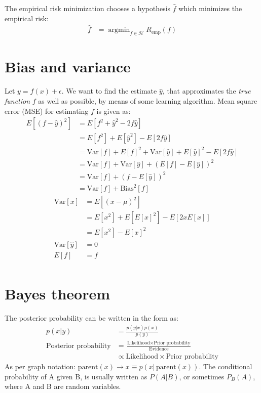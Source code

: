 \documentclass{book}
\DeclareMathOperator*{\argmin}{argmin}
\begin{document}
The empirical risk minimization chooses a hypothesis $\hat{f}$ which minimizes the empirical risk:
\begin{align*}
\hat{f} &=  \argmin_{f \in \mathcal{H}}{R_{\mbox{emp}}(f)}
\end{align*}

\section{Bias and variance}
Let $y = f(x) + \epsilon$. We want to find the estimate $\hat{y}$, that approximates the \emph{true function} $f$ as well as possible, by means of some learning algorithm. Mean square error (MSE) for estimating $f$ is given as:
\begin{align*}
E[(f-\hat{y})^2] &= E[f^2 + \hat{y}^2 - 2f\hat{y}]\\
			             &= E[f^2] + E[\hat{y}^2] - E[2f\hat{y}]\\
			             &= \mbox{Var}[f] + E[f]^2 + \mbox{Var}[\hat{y}] + E[\hat{y}]^2 - E[2f\hat{y}] \\
			             &= \mbox{Var}[f] +  \mbox{Var}[\hat{y}] + (E[f] - E[\hat{y}])^2 \\
			             &= \mbox{Var}[f] +  (f - E[\hat{y}])^2 \\
			             &= \mbox{Var}[f] + \mbox{Bias}^2[f]
\end{align*}
\begin{align*}
\mbox{Var}[x] &= E[(x-\mu)^2]\\
			           &= E[x^2] + E[E[x]^2] - E[2xE[x]]\\		 
			           &= E[x^2] - E[x]^2\\		
\mbox{Var}[\hat{y}] &= 0\\
E[f]  &= f\\		 			          	 			                     
\end{align*}

\section{Bayes theorem}
The posterior probability can be written in the form as:
\begin{align*} 
p(x|y) &= \frac{p(y|x)p(x)}{p(y)} \\
\mbox{Posterior probability} &= \frac{\mbox{Likelihood} \times \mbox {Prior probability}}{\mbox{Evidence}} \\
& \propto \mbox{Likelihood} \times \mbox {Prior probability}
\end{align*}
As per graph notation: $\mbox{parent}(x) \rightarrow x  \equiv p(x|\,\mbox{parent}(x))$.
The conditional probability of A given B, is usually written as $P(A|B)$, or sometimes $P_B(A)$, where A and B are random variables.
\end{document}
